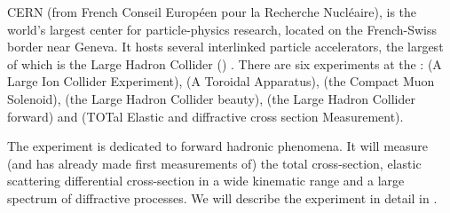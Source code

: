 CERN  (from French Conseil Europ\' een pour la Recherche Nucl\' eaire), is the world's largest center for particle-physics research, located on the French-Swiss border near Geneva. It hosts several interlinked particle accelerators, the largest of which is the Large Hadron Collider () . There are six experiments at the :  (A Large Ion Collider Experiment),  (A Toroidal  Apparatus),  (the Compact Muon Solenoid),  (the Large Hadron Collider beauty),  (the Large Hadron Collider forward) and  (TOTal Elastic and diffractive cross section Measurement).




The  experiment is dedicated to forward hadronic phenomena. It will measure (and has already made first measurements of) the total cross-section, elastic scattering differential cross-section in a wide kinematic range and a large spectrum of diffractive processes. We will describe the experiment in detail in .


